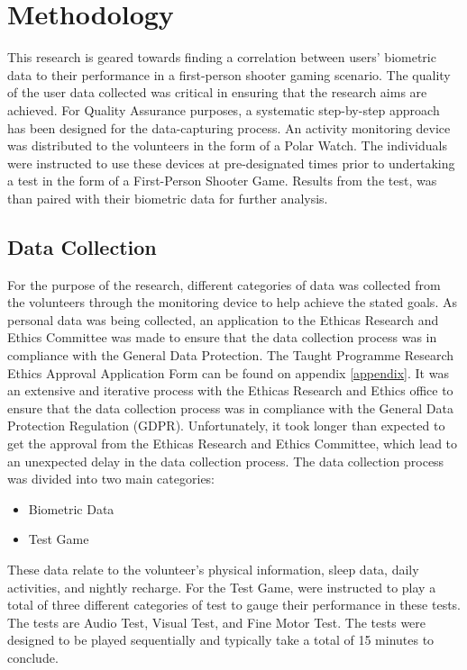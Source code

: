 \chapter{Methodology}

This research is geared towards finding a correlation between users' biometric data to their performance in a first-person shooter gaming scenario. The quality of the user data 
collected was critical in ensuring that the research aims are achieved. For Quality Assurance purposes, a systematic step-by-step approach has been designed for the data-capturing 
process. An activity monitoring device was distributed to the volunteers in the form of a Polar Watch. The individuals were instructed to use these devices at pre-designated times 
prior to undertaking a test in the form of a First-Person Shooter Game. Results from the test, was than paired with their biometric data for further analysis.

\section{Data Collection}

For the purpose of the research, different categories of data was collected from the volunteers through the monitoring device to help achieve the stated goals. As personal data was
being collected, an application to the Ethicas Research and Ethics Committee was made to ensure that the data collection process was in compliance with the General Data Protection. 
The Taught Programme Research Ethics Approval Application Form can be found on appendix \ref{appendix}. It was an extensive and iterative process with the Ethicas Research and Ethics 
office to ensure that the data collection process was in compliance with the General Data Protection Regulation (GDPR). Unfortunately, it took longer than expected to get the approval
from the Ethicas Research and Ethics Committee, which lead to an unexpected delay in the data collection process. The data collection process was divided into two main categories:

\begin{itemize}
    \item Biometric Data
    \item Test Game
\end{itemize}




These data relate 
to the volunteer’s physical information, sleep data, daily activities, and nightly recharge.
For the Test Game, were instructed to play a total of three different categories of test to gauge their performance in these tests. The tests are Audio Test, Visual Test, and Fine Motor
Test. The tests were designed to be played sequentially and typically take a total of 15 minutes to conclude.

